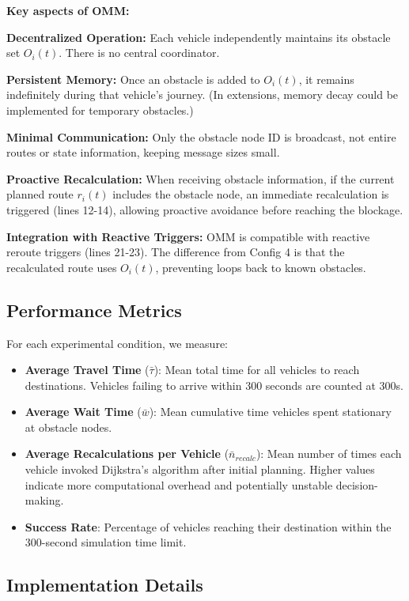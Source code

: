 \documentclass[conference]{IEEEtran}
\begin{document}
\textbf{Key aspects of OMM:}

\textbf{Decentralized Operation:} Each vehicle independently maintains its obstacle set $O_i(t)$. There is no central coordinator.

\textbf{Persistent Memory:} Once an obstacle is added to $O_i(t)$, it remains indefinitely during that vehicle's journey. (In extensions, memory decay could be implemented for temporary obstacles.)

\textbf{Minimal Communication:} Only the obstacle node ID is broadcast, not entire routes or state information, keeping message sizes small.

\textbf{Proactive Recalculation:} When receiving obstacle information, if the current planned route $r_i(t)$ includes the obstacle node, an immediate recalculation is triggered (lines 12-14), allowing proactive avoidance before reaching the blockage.

\textbf{Integration with Reactive Triggers:} OMM is compatible with reactive reroute triggers (lines 21-23). The difference from Config 4 is that the recalculated route uses $O_i(t)$, preventing loops back to known obstacles.

\subsection{Performance Metrics}

For each experimental condition, we measure:

\begin{itemize}
    \item \textbf{Average Travel Time} ($\bar{\tau}$): Mean total time for all vehicles to reach destinations. Vehicles failing to arrive within 300 seconds are counted at 300s.
    \item \textbf{Average Wait Time} ($\bar{w}$): Mean cumulative time vehicles spent stationary at obstacle nodes.
    \item \textbf{Average Recalculations per Vehicle} ($\bar{n}_{recalc}$): Mean number of times each vehicle invoked Dijkstra's algorithm after initial planning. Higher values indicate more computational overhead and potentially unstable decision-making.
    \item \textbf{Success Rate}: Percentage of vehicles reaching their destination within the 300-second simulation time limit.
\end{itemize}

\subsection{Implementation Details}
\end{document}
